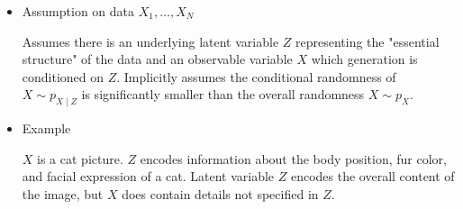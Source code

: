 \documentclass{beamer}
\begin{document}
\begin{frame}[allowframebreaks]

\begin{itemize}
    \item
    Assumption on data $X_{1}, \ldots, X_{N}$

    Assumes there is an underlying latent variable $Z$ representing the "essential structure" of the data and an observable variable $X$ which generation is conditioned on $Z$. Implicitly assumes the conditional randomness of $X \sim p_{X \mid Z}$ is significantly smaller than the overall randomness $X \sim p_{X}$.
    \item
    Example

    $X$ is a cat picture. $Z$ encodes information about the body position, fur color, and facial expression of a cat. Latent variable $Z$ encodes the overall content of the image, but $X$ does contain details not specified in $Z$.
\end{itemize}

\end{frame}
\end{document}
